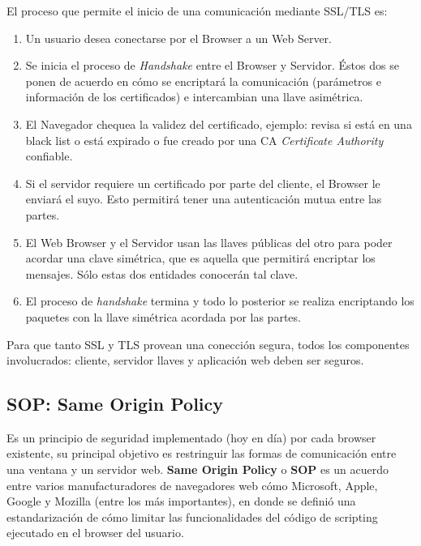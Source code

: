     El proceso que permite el inicio de una comunicación mediante SSL/TLS es:
    \begin{enumerate}
        \item Un usuario desea conectarse por el Browser a un Web Server.
        \item Se inicia el proceso de \textit{Handshake} entre el Browser y Servidor. Éstos dos se ponen de acuerdo en cómo se encriptará la comunicación (parámetros e información de los certificados) e intercambian una llave asimétrica.
        \item El Navegador chequea la validez del certificado, ejemplo: revisa si está en una black list o está expirado o fue creado por una CA \textit{Certificate Authority} confiable.
        \item Si el servidor requiere un certificado por parte del cliente, el Browser le enviará el suyo. Esto permitirá tener una autenticación mutua entre las partes.
        \item El Web Browser y el Servidor usan las llaves públicas del otro para poder acordar una clave simétrica, que es aquella que permitirá encriptar los mensajes. Sólo estas dos entidades conocerán tal clave.
        \item El proceso de \textit{handshake} termina y todo lo posterior se realiza encriptando los paquetes con la llave simétrica acordada por las partes.
    \end{enumerate}

    Para que tanto SSL y TLS provean una conección segura, todos los componentes involucrados: cliente, servidor llaves y aplicación web deben ser seguros.


    \subsection{SOP: Same Origin Policy} %
    \label{chap2:SOP}

    Es un principio de seguridad implementado (hoy en día) por cada browser existente, su principal objetivo es restringuir las formas de comunicación entre una ventana y un servidor web. \textbf{Same Origin Policy} o \textbf{SOP} es un acuerdo entre varios manufacturadores de navegadores web cómo Microsoft, Apple, Google y Mozilla (entre los más importantes), en donde se definió una estandarización de cómo limitar las funcionalidades del código de scripting ejecutado en el browser del usuario. 

